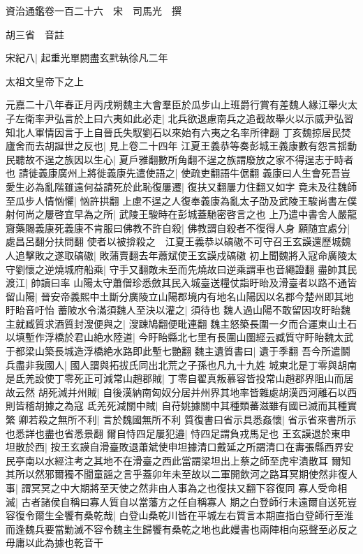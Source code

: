 資治通鑑卷一百二十六　宋　司馬光　撰

胡三省　音註

宋紀八|{
	起重光單閼盡玄黓執徐凡二年}


太祖文皇帝下之上

元嘉二十八年春正月丙戌朔魏主大會羣臣於瓜步山上班爵行賞有差魏人緣江舉火太子左衛率尹弘言於上曰六夷如此必走|{
	北兵欲退慮南兵之追截故舉火以示威尹弘習知北人軍情因言于上自晉氏失馭劉石以來始有六夷之名率所律翻}
丁亥魏掠居民焚廬舍而去胡誕世之反也|{
	見上卷二十四年}
江夏王義恭等奏彭城王義康數有怨言揺動民聽故不逞之族因以生心|{
	夏戶雅翻數所角翻不逞之族謂廢放之家不得逞志于時者也}
請徙義康廣州上將徙義康先遣使語之|{
	使疏吏翻語牛倨翻}
義康曰人生會死吾豈愛生必為亂階雖遠何益請死於此恥復屢遷|{
	復扶又翻屢力住翻又如字}
竟未及往魏師至瓜步人情忷懼|{
	忷許拱翻}
上慮不逞之人復奉義康為亂太子劭及武陵王駿尚書左僕射何尚之屢啓宜早為之所|{
	武陵王駿時在彭城蓋馳密啓言之也}
上乃遣中書舍人嚴龍齎藥賜義康死義康不肯服曰佛教不許自殺|{
	佛教謂自殺者不復得人身}
願随宜處分|{
	處昌呂翻分扶問翻}
使者以被揜殺之　江夏王義恭以碻磝不可守召王玄謨還歷城魏人追擊敗之遂取碻磝|{
	敗蒲賣翻去年蕭斌使王玄謨戍碻磝}
初上聞魏將入寇命廣陵太守劉懷之逆燒城府船乘|{
	守手又翻敵未至而先燒故曰逆乘謂車也音繩證翻}
盡帥其民渡江|{
	帥讀曰率}
山陽太守蕭僧珍悉斂其民入城臺送糧仗詣盱眙及滑臺者以路不通皆留山陽|{
	晉安帝義熙中土斷分廣陵立山陽郡境内有地名山陽因以名郡今楚州即其地盱眙音吁怡}
蓄陂水令滿須魏人至決以灌之|{
	須待也}
魏人過山陽不敢留因攻盱眙魏主就臧質求酒質封溲便與之|{
	溲踈鳩翻便毗連翻}
魏主怒築長圍一夕而合運東山土石以填塹作浮橋於君山絶水陸道|{
	今盱眙縣北七里有長圍山圖經云臧質守盱眙魏太武于都梁山築長城造浮橋絶水路即此塹七艷翻}
魏主遺質書曰|{
	遺于季翻}
吾今所遣鬬兵盡非我國人|{
	國人謂與拓拔氏同出北荒之子孫也凡九十九姓}
城東北是丁零與胡南是氐羌設使丁零死正可減常山趙郡賊|{
	丁零自翟真叛慕容皆投常山趙郡界阻山而居故云然}
胡死減并州賊|{
	自後漢納南匈奴分居并州界其地率皆雜處胡漢西河離石以西則皆稽胡據之為寇}
氐羌死減關中賊|{
	自苻姚據關中其種類蕃滋雖有國已滅而其種實繁}
卿若殺之無所不利|{
	言於魏國無所不利}
質復書曰省示具悉姦懷|{
	省示省來書所示也悉詳也盡也省悉景翻}
爾自恃四足屢犯邉|{
	恃四足謂負戎馬足也}
王玄謨退於東申坦散於西|{
	按王玄謨自滑臺敗退蕭斌使申坦據清口戴延之所謂清口在夀張縣西界安民亭南以水經注考之其地不在滑臺之西此當謂梁坦出上蔡之師至虎牢潰散耳}
爾知其所以然邪爾獨不聞童謡之言乎蓋卯年未至故以二軍開飲河之路耳冥期使然非復人事|{
	謂冥冥之中大期將至天使之然非由人事為之也復扶又翻下容復同}
寡人受命相滅|{
	古者諸侯自稱曰寡人質自以當藩方之任自稱寡人}
期之白登師行未遠爾自送死豈容復令爾生全饗有桑乾哉|{
	白登山桑乾川皆在平城左右質言本期直指白登師行至淮而逢魏兵要當勦滅不容令魏主生歸饗有桑乾之地也此嫚書也兩陣相向惡聲至必反之毋庸以此為據也乾音干}
